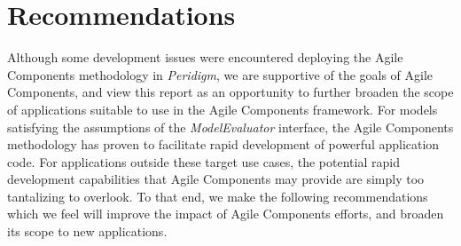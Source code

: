 \documentclass[pdf,ps2pdf,12pt,report]{SANDreport}
\theoremstyle{plain}
\theoremstyle{definition}
\theoremstyle{remark}
\numberwithin{equation}{section}
\begin{document}
\section{Recommendations} \label{sec:recommendations}
Although some development issues were encountered deploying the Agile Components methodology in \emph{Peridigm}, we are supportive of the goals of Agile Components, and view this report as an opportunity to further broaden the scope of applications suitable to use in the Agile Components framework. For models satisfying the assumptions of the \emph{ModelEvaluator} interface, the Agile Components methodology has proven to facilitate rapid development of powerful application code. For applications outside these target use cases, the potential rapid development capabilities that Agile Components may provide are simply too tantalizing to overlook. To that end, we make the following recommendations which we feel will improve the impact of Agile Components efforts, and broaden its scope to new applications.
\end{document}
